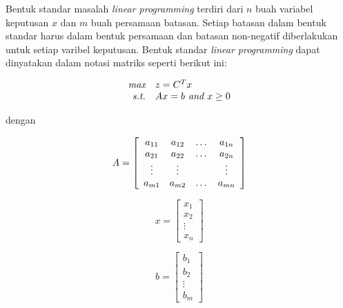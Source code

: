 Bentuk standar masalah \textit{linear programming} terdiri dari $n$ buah variabel keputusan $x$ dan $m$ buah persamaan batasan. Setiap batasan dalam bentuk standar harus dalam bentuk persamaan dan batasan non-negatif diberlakukan untuk setiap varibel keputusan. Bentuk standar \textit{linear programming} dapat dinyatakan dalam notasi matriks seperti berikut ini:
        
\begin{equation*}
	\begin{array}{r l}
    	\textit{max}   & z=C^Tx \\
        \textit{s.t.} & Ax=b \textit{ and } x\geq0
	\end{array}    
\end{equation*}

dengan


\begin{equation*}
	A = \left[
	\begin{array}{c c c c}
    	a_{11} & a_{12} & \dots & a_{1n}\\
    	a_{21} & a_{22} & \dots & a_{2n}\\
    	\vdots & \vdots & & \vdots\\
    	a_{m1} & a_{m2} & \dots & a_{mn}
	\end{array}
	\right]    
\end{equation*}

\begin{equation*}
	x = \left[
	\begin{array}{c}
    	x_1\\
    	x_2\\
    	\vdots\\
    	x_n
	\end{array}
	\right]    
\end{equation*}

\begin{equation*}
	b = \left[
	\begin{array}{c}
    	b_1\\
    	b_2\\
    	\vdots\\
    	b_m
	\end{array}
	\right]    
\end{equation*}

